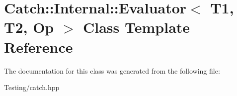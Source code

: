 \hypertarget{class_catch_1_1_internal_1_1_evaluator}{\section{Catch\-:\-:Internal\-:\-:Evaluator$<$ T1, T2, Op $>$ Class Template Reference}
\label{class_catch_1_1_internal_1_1_evaluator}
}


The documentation for this class was generated from the following file\-:\begin{DoxyCompactItemize}
\item 
Testing/catch.\-hpp\end{DoxyCompactItemize}
